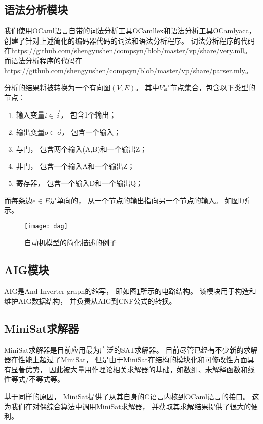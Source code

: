 \subsection{语法分析模块}
我们使用OCaml语言自带的词法分析工具OCamllex和语法分析工具OCamlyacc，
创建了针对上述简化的编码器代码的词法和语法分析程序。
词法分析程序的代码在\url{https://github.com/shengyushen/compsyn/blob/master/vp/share/very.mll}。
而语法分析程序的代码在\url{https://github.com/shengyushen/compsyn/blob/master/vp/share/parser.mly}。

分析的结果将被转换为一个有向图$(V,E)$。
其中$V$是节点集合，包含以下类型的节点：
\begin{enumerate}
\item 输入变量$i\in\vec{i}$，
包含1个输出；
\item 输出变量$o\in\vec{o}$，
包含一个输入；
\item 与门，
包含两个输入(A,B)和一个输出Z；
\item 非门，
包含一个输入A和一个输出Z；
\item 寄存器，
包含一个输入D和一个输出Q；
\end{enumerate}

而每条边$e\in E$是单向的，
从一个节点的输出指向另一个节点的输入。
如图\ref{fig_dag}所示。


\begin{figure}[t]
\centering
\texttt{[image: dag]}
\caption{自动机模型的简化描述的例子}
\label{fig_dag}
\end{figure}


\subsection{AIG模块}

AIG是And-Inverter graph的缩写，
即如图\ref{fig_dag}所示的电路结构。
该模块用于构造和维护AIG数据结构，
并负责从AIG到CNF公式的转换。

\subsection{MiniSat求解器}

MiniSat求解器是目前应用最为广泛的SAT求解器。
目前尽管已经有不少新的求解器在性能上超过了MiniSat，
但是由于MiniSat在结构的模块化和可修改性方面具有显著优势，
因此被大量用作理论相关求解器的基础，如数组、未解释函数和线性等式/不等式等。

基于同样的原因，
MiniSat提供了从其自身的C语言内核到OCaml语言的接口。
这为我们在对偶综合算法中调用MiniSat求解器，
并获取其求解结果提供了很大的便利。

